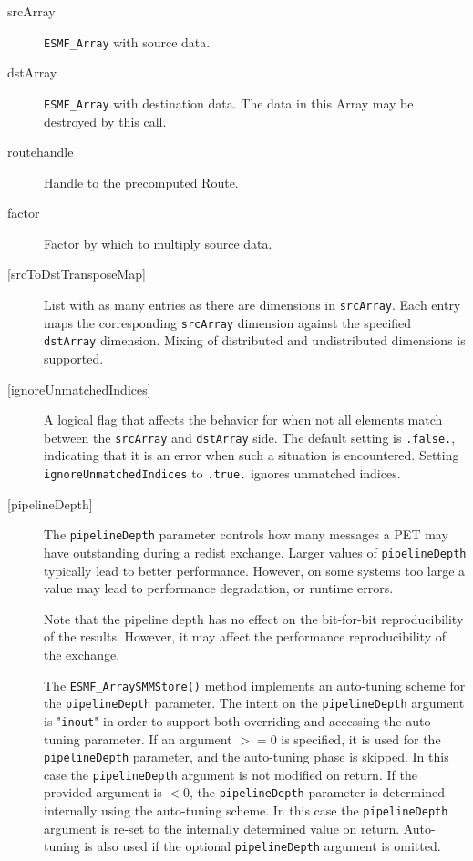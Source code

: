      \begin{description}
  
     \item [srcArray]
       {\tt ESMF\_Array} with source data.
  
     \item [dstArray]
       {\tt ESMF\_Array} with destination data. The data in this Array may be
       destroyed by this call.
  
     \item [routehandle]
       Handle to the precomputed Route.
  
     \item [factor]
       Factor by which to multiply source data.
  
     \item [{[srcToDstTransposeMap]}]
       List with as many entries as there are dimensions in {\tt srcArray}. Each
       entry maps the corresponding {\tt srcArray} dimension against the 
       specified {\tt dstArray} dimension. Mixing of distributed and
       undistributed dimensions is supported.
  
     \item [{[ignoreUnmatchedIndices]}]
       A logical flag that affects the behavior for when not all elements match
       between the {\tt srcArray} and {\tt dstArray} side. The default setting
       is {\tt .false.}, indicating that it is an error when such a situation is 
       encountered. Setting {\tt ignoreUnmatchedIndices} to {\tt .true.} ignores
       unmatched indices.
  
     \item [{[pipelineDepth]}]
       The {\tt pipelineDepth} parameter controls how many messages a PET
       may have outstanding during a redist exchange. Larger values
       of {\tt pipelineDepth} typically lead to better performance. However,
       on some systems too large a value may lead to performance degradation,
       or runtime errors.
  
       Note that the pipeline depth has no effect on the bit-for-bit
       reproducibility of the results. However, it may affect the performance
       reproducibility of the exchange.
  
       The {\tt ESMF\_ArraySMMStore()} method implements an auto-tuning scheme
       for the {\tt pipelineDepth} parameter. The intent on the 
       {\tt pipelineDepth} argument is "{\tt inout}" in order to 
       support both overriding and accessing the auto-tuning parameter.
       If an argument $>= 0$ is specified, it is used for the 
       {\tt pipelineDepth} parameter, and the auto-tuning phase is skipped.
       In this case the {\tt pipelineDepth} argument is not modified on
       return. If the provided argument is $< 0$, the {\tt pipelineDepth}
       parameter is determined internally using the auto-tuning scheme. In this
       case the {\tt pipelineDepth} argument is re-set to the internally
       determined value on return. Auto-tuning is also used if the optional 
       {\tt pipelineDepth} argument is omitted.
  

\end{description}
